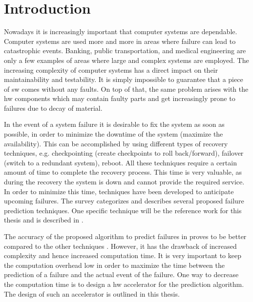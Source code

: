 \documentclass[mscthesis]{usiinfthesis}
\begin{document}
\tableofcontents 
\listoffigures %
\listoftables %

\mainmatter

\chapter{Introduction}
\label{ch:intro}
\glsresetall %

Nowadays it is increasingly important that computer systems are dependable.
Computer systems are used more and more in areas where failure can lead to
catastrophic events.  Banking, public transportation, and medical engineering
are only a few examples of areas where large and complex systems are employed.
The increasing complexity of computer systems has a direct impact on their
maintainability and testability. It is simply impossible to guarantee that
a piece of \gls{sw} comes without any faults. On top of that, the same problem
arises with the \gls{hw} components which may contain faulty parts and get
increasingly prone to failures due to decay of material.

In the event of a system failure it is desirable to fix the system as soon as
possible, in order to minimize the downtime of the system (maximize the
availability). This can be accomplished by using different types of recovery
techniques, e.g. checkpointing (create checkpoints to roll back/forward),
failover (switch to a redundant system), reboot. All these techniques require
a certain amount of time to complete the recovery process. This time is very
valuable, as during the recovery the system is down and cannot provide the
required service. In order to minimize this time, techniques have been
developed to anticipate upcoming failures. The survey \cite{ACM10_Salfner}
categorizes and describes several proposed failure prediction techniques. One
specific technique will be the reference work for this thesis and is described
in \cite{salfner08}.

The accuracy of the proposed algorithm to predict failures in
\cite{salfner08} proves to be better compared to the other techniques
\cite{lin88, ICDM02_Vilalta, domeniconi02}. However, it has the drawback of
increased complexity and hence increased computation time. It is very important
to keep the computation overhead low in order to maximize the time between the
prediction of a failure and the actual event of the failure. One way to
decrease the computation time is to design a \gls{hw} accelerator for the
prediction algorithm. The design of such an accelerator is outlined in this
thesis.
\end{document}
